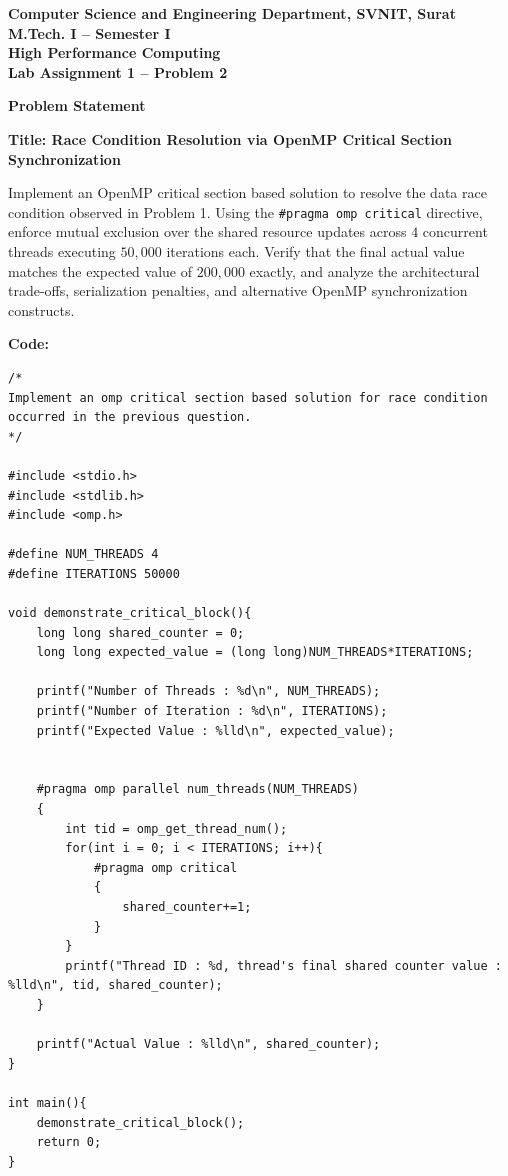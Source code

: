 \documentclass[12pt]{article}
\begin{document}

\begin{center}
\textbf{Computer Science and Engineering Department, SVNIT, Surat}\\
\textbf{M.Tech. I -- Semester I}\\
\textbf{High Performance Computing}\\
\textbf{Lab Assignment 1 -- Problem 2}
\end{center}

\vspace{0.4cm}

\textbf{Problem Statement}

\textbf{Title: Race Condition Resolution via OpenMP Critical Section Synchronization}

Implement an OpenMP critical section based solution to resolve the data race condition observed in Problem 1. Using the \texttt{\#pragma omp critical} directive, enforce mutual exclusion over the shared resource updates across $4$ concurrent threads executing $50,000$ iterations each. Verify that the final actual value matches the expected value of $200,000$ exactly, and analyze the architectural trade-offs, serialization penalties, and alternative OpenMP synchronization constructs.

\vspace{0.3cm}

\textbf{Code:}

\begin{lstlisting}
/*
Implement an omp critical section based solution for race condition 
occurred in the previous question.
*/

#include <stdio.h>
#include <stdlib.h>
#include <omp.h>

#define NUM_THREADS 4
#define ITERATIONS 50000

void demonstrate_critical_block(){
    long long shared_counter = 0;
    long long expected_value = (long long)NUM_THREADS*ITERATIONS;
    
    printf("Number of Threads : %d\n", NUM_THREADS);
    printf("Number of Iteration : %d\n", ITERATIONS);
    printf("Expected Value : %lld\n", expected_value);
    
    
    #pragma omp parallel num_threads(NUM_THREADS)
    {
        int tid = omp_get_thread_num();
        for(int i = 0; i < ITERATIONS; i++){
            #pragma omp critical
            {
                shared_counter+=1;
            }
        }
        printf("Thread ID : %d, thread's final shared counter value : %lld\n", tid, shared_counter);
    }

    printf("Actual Value : %lld\n", shared_counter);
}

int main(){
    demonstrate_critical_block();
    return 0;
}
\end{lstlisting}
\end{document}
